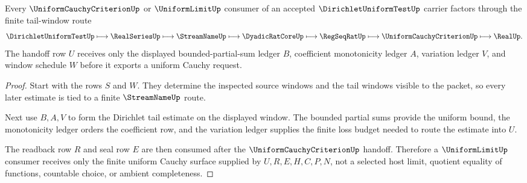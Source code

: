 \begin{theorem}
\label{thm:dirichlet-uniform-test-uniform-cauchy-handoff}
Every $\UniformCauchyCriterionUp$ or $\UniformLimitUp$ consumer of an accepted $\DirichletUniformTestUp$ carrier factors through the finite tail-window route
$$
\DirichletUniformTestUp \longmapsto \RealSeriesUp \longmapsto \StreamNameUp \longmapsto \DyadicRatCoreUp \longmapsto \RegSeqRatUp \longmapsto \UniformCauchyCriterionUp \longmapsto \RealUp .
$$
The handoff row $U$ receives only the displayed bounded-partial-sum ledger $B$, coefficient monotonicity ledger $A$, variation ledger $V$, and window schedule $W$ before it exports a uniform Cauchy request.
\end{theorem}
\begin{proof}
Start with the rows $S$ and $W$. They determine the inspected source windows and the tail windows visible to the packet, so every later estimate is tied to a finite $\StreamNameUp$ route.

Next use $B,A,V$ to form the Dirichlet tail estimate on the displayed window. The bounded partial sums provide the uniform bound, the monotonicity ledger orders the coefficient row, and the variation ledger supplies the finite loss budget needed to route the estimate into $U$.

The readback row $R$ and seal row $E$ are then consumed after the $\UniformCauchyCriterionUp$ handoff. Therefore a $\UniformLimitUp$ consumer receives only the finite uniform Cauchy surface supplied by $U,R,E,H,C,P,N$, not a selected host limit, quotient equality of functions, countable choice, or ambient completeness.
\end{proof}


